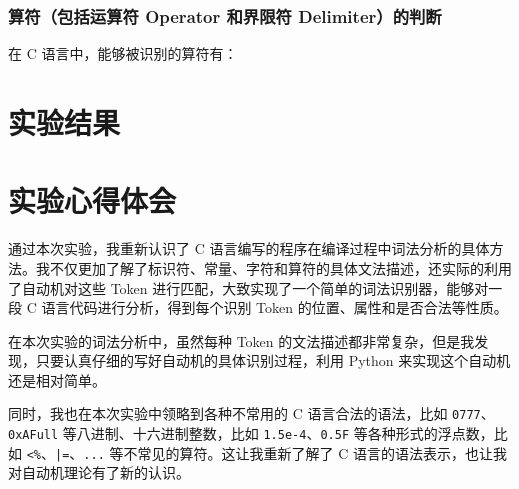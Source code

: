\documentclass[UTF8]{ctexart}
\begin{document}
\subsubsection{算符（包括运算符 Operator 和界限符 Delimiter）的判断}
在 C 语言中，能够被识别的算符有：

\section{实验结果}

\section{实验心得体会}
通过本次实验，我重新认识了 C 语言编写的程序在编译过程中词法分析的具体方法。我不仅更加了解了标识符、常量、字符和算符的具体文法描述，还实际的利用了自动机对这些 Token 进行匹配，大致实现了一个简单的词法识别器，能够对一段 C 语言代码进行分析，得到每个识别 Token 的位置、属性和是否合法等性质。

在本次实验的词法分析中，虽然每种 Token 的文法描述都非常复杂，但是我发现，只要认真仔细的写好自动机的具体识别过程，利用 Python 来实现这个自动机还是相对简单。

同时，我也在本次实验中领略到各种不常用的 C 语言合法的语法，比如 \texttt{0777}、\texttt{0xAFull} 等八进制、十六进制整数，比如 \texttt{1.5e-4}、\texttt{0.5F} 等各种形式的浮点数，比如 \texttt{<\%}、\texttt{|=}、\texttt{...} 等不常见的算符。这让我重新了解了 C 语言的语法表示，也让我对自动机理论有了新的认识。
\end{document}
